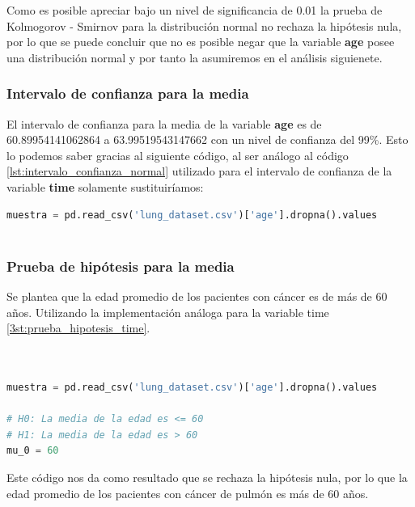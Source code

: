 \documentclass[a4paper,12pt]{article}
\begin{document}
    Como es posible apreciar bajo un nivel de significancia de 0.01 la prueba de Kolmogorov - Smirnov para la distribución normal no rechaza la hipótesis nula, por lo que se puede concluir que no es posible negar que la variable \textbf{age} posee una distribución normal y por tanto la  asumiremos en el análisis siguienete.
    
    \subsubsection*{Intervalo de confianza para la media}

    El intervalo de confianza para la media de la variable \textbf{age} es de 60.89954141062864 a 63.99519543147662 con un nivel de confianza del 99\%. Esto lo podemos saber gracias al siguiente código, al ser análogo al código \ref{lst:intervalo_confianza_normal} utilizado para el intervalo de confianza de la variable \textbf{time} solamente sustituiríamos:

    \begin{lstlisting}[language=Python, caption={Código en Python para calcular el intervalo de confianza}]
muestra = pd.read_csv('lung_dataset.csv')['age'].dropna().values
    
    \end{lstlisting}

    \subsubsection*{Prueba de hipótesis para la media}

    Se plantea que la edad promedio de los pacientes con cáncer es de más de 60 años. Utilizando la implementación análoga para la variable time \ref{3st:prueba_hipotesis_time}.

    \begin{lstlisting}[language=Python, caption={Código en Python para calcular el estimador de la prueba de hipotesis},label={3st:prueba_hipotesis_age}]
        

muestra = pd.read_csv('lung_dataset.csv')['age'].dropna().values

# H0: La media de la edad es <= 60
# H1: La media de la edad es > 60
mu_0 = 60  

    \end{lstlisting}

    Este código nos da como resultado que se rechaza la hipótesis nula, por lo que la edad promedio de los pacientes con cáncer de pulmón es más de 60 años. 
\end{document}
